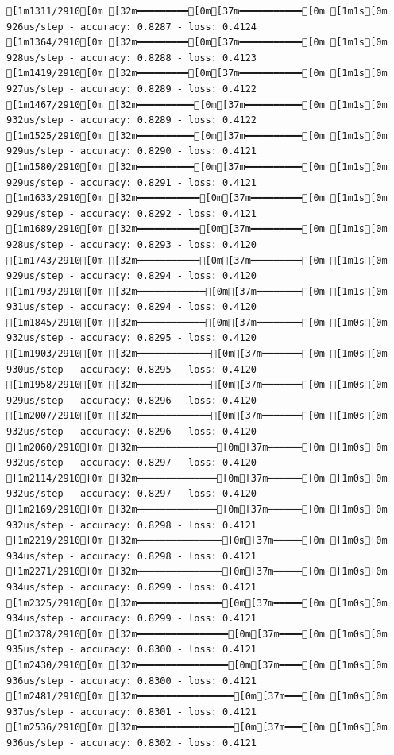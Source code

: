 \documentclass[
  letterpaper,
  DIV=11,
  numbers=noendperiod]{scrartcl}
\begin{document}
\begin{verbatim}
[1m1311/2910[0m [32m━━━━━━━━━[0m[37m━━━━━━━━━━━[0m [1m1s[0m 926us/step - accuracy: 0.8287 - loss: 0.4124
[1m1364/2910[0m [32m━━━━━━━━━[0m[37m━━━━━━━━━━━[0m [1m1s[0m 928us/step - accuracy: 0.8288 - loss: 0.4123
[1m1419/2910[0m [32m━━━━━━━━━[0m[37m━━━━━━━━━━━[0m [1m1s[0m 927us/step - accuracy: 0.8289 - loss: 0.4122
[1m1467/2910[0m [32m━━━━━━━━━━[0m[37m━━━━━━━━━━[0m [1m1s[0m 932us/step - accuracy: 0.8289 - loss: 0.4122
[1m1525/2910[0m [32m━━━━━━━━━━[0m[37m━━━━━━━━━━[0m [1m1s[0m 929us/step - accuracy: 0.8290 - loss: 0.4121
[1m1580/2910[0m [32m━━━━━━━━━━[0m[37m━━━━━━━━━━[0m [1m1s[0m 929us/step - accuracy: 0.8291 - loss: 0.4121
[1m1633/2910[0m [32m━━━━━━━━━━━[0m[37m━━━━━━━━━[0m [1m1s[0m 929us/step - accuracy: 0.8292 - loss: 0.4121
[1m1689/2910[0m [32m━━━━━━━━━━━[0m[37m━━━━━━━━━[0m [1m1s[0m 928us/step - accuracy: 0.8293 - loss: 0.4120
[1m1743/2910[0m [32m━━━━━━━━━━━[0m[37m━━━━━━━━━[0m [1m1s[0m 929us/step - accuracy: 0.8294 - loss: 0.4120
[1m1793/2910[0m [32m━━━━━━━━━━━━[0m[37m━━━━━━━━[0m [1m1s[0m 931us/step - accuracy: 0.8294 - loss: 0.4120
[1m1845/2910[0m [32m━━━━━━━━━━━━[0m[37m━━━━━━━━[0m [1m0s[0m 932us/step - accuracy: 0.8295 - loss: 0.4120
[1m1903/2910[0m [32m━━━━━━━━━━━━━[0m[37m━━━━━━━[0m [1m0s[0m 930us/step - accuracy: 0.8295 - loss: 0.4120
[1m1958/2910[0m [32m━━━━━━━━━━━━━[0m[37m━━━━━━━[0m [1m0s[0m 929us/step - accuracy: 0.8296 - loss: 0.4120
[1m2007/2910[0m [32m━━━━━━━━━━━━━[0m[37m━━━━━━━[0m [1m0s[0m 932us/step - accuracy: 0.8296 - loss: 0.4120
[1m2060/2910[0m [32m━━━━━━━━━━━━━━[0m[37m━━━━━━[0m [1m0s[0m 932us/step - accuracy: 0.8297 - loss: 0.4120
[1m2114/2910[0m [32m━━━━━━━━━━━━━━[0m[37m━━━━━━[0m [1m0s[0m 932us/step - accuracy: 0.8297 - loss: 0.4120
[1m2169/2910[0m [32m━━━━━━━━━━━━━━[0m[37m━━━━━━[0m [1m0s[0m 932us/step - accuracy: 0.8298 - loss: 0.4121
[1m2219/2910[0m [32m━━━━━━━━━━━━━━━[0m[37m━━━━━[0m [1m0s[0m 934us/step - accuracy: 0.8298 - loss: 0.4121
[1m2271/2910[0m [32m━━━━━━━━━━━━━━━[0m[37m━━━━━[0m [1m0s[0m 934us/step - accuracy: 0.8299 - loss: 0.4121
[1m2325/2910[0m [32m━━━━━━━━━━━━━━━[0m[37m━━━━━[0m [1m0s[0m 934us/step - accuracy: 0.8299 - loss: 0.4121
[1m2378/2910[0m [32m━━━━━━━━━━━━━━━━[0m[37m━━━━[0m [1m0s[0m 935us/step - accuracy: 0.8300 - loss: 0.4121
[1m2430/2910[0m [32m━━━━━━━━━━━━━━━━[0m[37m━━━━[0m [1m0s[0m 936us/step - accuracy: 0.8300 - loss: 0.4121
[1m2481/2910[0m [32m━━━━━━━━━━━━━━━━━[0m[37m━━━[0m [1m0s[0m 937us/step - accuracy: 0.8301 - loss: 0.4121
[1m2536/2910[0m [32m━━━━━━━━━━━━━━━━━[0m[37m━━━[0m [1m0s[0m 936us/step - accuracy: 0.8302 - loss: 0.4121

\end{verbatim}
\end{document}

